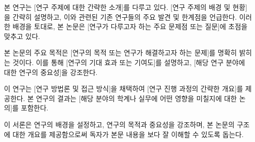 본 연구는 [연구 주제에 대한 간략한 소개]를 다루고 있다. [연구 주제의 배경 및 현황]을 간략히 설명하고, 이와 관련된 기존 연구들의 주요 발견 및 한계점을 언급한다. 이러한 배경을 토대로, 본 논문은 [연구가 다루고자 하는 주요 문제점 또는 질문]에 초점을 맞추고 있다.

본 논문의 주요 목적은 [연구의 목적 또는 연구가 해결하고자 하는 문제]를 명확히 밝히는 것이다. 이를 통해 [연구의 기대 효과 또는 기여도]를 설명하고, [해당 연구 분야에 대한 연구의 중요성]을 강조한다.

이 연구는 [연구 방법론 및 접근 방식]을 채택하여 [연구 진행 과정의 간략한 개요]를 제공한다. 본 연구의 결과는 [해당 분야의 학계나 실무에 어떤 영향을 미칠지에 대한 논의]를 포함한다.

이 서론은 연구의 배경을 설정하고, 연구의 목적과 중요성을 강조하며, 본 논문의 구조에 대한 개요를 제공함으로써 독자가 본문 내용을 보다 잘 이해할 수 있도록 돕는다.